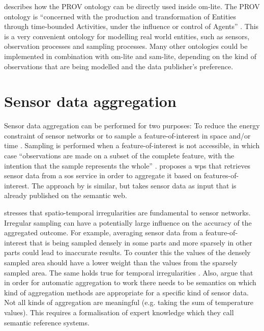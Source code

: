 \cite{SSW:Cox4} describes how the PROV ontology \citep{LD:PROV} can be directly used inside om-lite. The PROV ontology is \enquote{concerned with the production and transformation of Entities through time-bounded Activities, under the influence or control of Agents} \cite[p. 12]{SSW:Cox4}. This is a very convenient ontology for modelling real world entities, such as sensors, observation processes and sampling processes. Many other ontologies could be implemented in combination with om-lite and sam-lite, depending on the kind of observations that are being modelled and the data publisher's preference. 

\section{Sensor data aggregation}
Sensor data aggregation can be performed for two purposes: To reduce the energy constraint of sensor networks \citep{SW:Korteweg} or to sample a feature-of-interest in space and/or time \citep{SDI:INSPIRE2}. Sampling is performed when a feature-of-interest is not accessible, in which case \enquote{observations are made on a subset of the complete feature, with the intention that the sample represents the whole} \citep{SSW:Cox3}. \cite{SSW:Stasch3} proposes a \ac{wps} that retrieves sensor data from a \ac{sos} service in order to aggregate it based on features-of-interest. The approach by \cite{SSW:Stasch} is similar, but takes sensor data as input that is already published on the semantic web.

\cite{SW:Ganesan} stresses that spatio-temporal irregularities are fundamental to sensor networks. Irregular sampling can have a potentially large influence on the accuracy of the aggregated outcome. For example, averaging sensor data from a feature-of-interest that is being sampled densely in some parts and more sparsely in other parts could lead to inaccurate results. To counter this the values of the densely sampled area should have a lower weight than the values from the sparsely sampled area. The same holds true for temporal irregularities \citep{SW:Ganesan}. Also, \cite{SSW:Stasch4} argue that in order for automatic aggregation to work there needs to be semantics on which kind of aggregation methods are appropriate for a specific kind of sensor data. Not all kinds of aggregation are meaningful (e.g. taking the sum of temperature values). This requires a formalisation of expert knowledge which they call semantic reference systems. 




